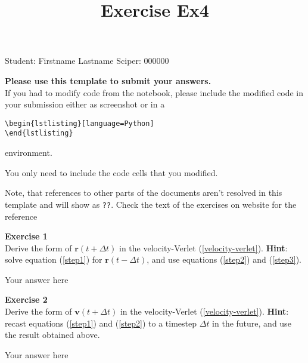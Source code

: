 \documentclass{article}
\title{Exercise Ex4}
\begin{document}
\maketitle\maketitle
\begin{center}\logo\end{center}


Student:  Firstname Lastname    Sciper: 000000

\begin{mdframed}
\textbf{Please use this template to submit your answers.}\\
If you had to modify code from the notebook, please include the modified code in your submission either as screenshot or in a

\begin{verbatim}
\begin{lstlisting}[language=Python]
\end{lstlisting}
\end{verbatim}

environment.

You only need to include the code cells that you modified.

Note, that references to other parts of the documents aren't resolved in this template and will show as \texttt{??}. Check the text of the exercises on website for the reference
\end{mdframed}

\begin{mdframed}
\textbf{Exercise 1}\\
Derive the form of $\mathbf{r}(t + \Delta t)$ in the velocity-Verlet
(\ref{velocity-verlet}). \textbf{Hint}: solve equation  (\ref{step1}) for  $\mathbf{r}(t - \Delta t)$, and use equations (\ref{step2}) and  (\ref{step3}).
\end{mdframed}

Your answer here

\begin{mdframed}
\textbf{Exercise 2}\\
Derive the form of $\mathbf{v}(t + \Delta t)$ in the velocity-Verlet  (\ref{velocity-verlet}). \textbf{Hint}: recast equations  (\ref{step1}) and (\ref{step2}) to a  timestep $\Delta t$ in the future, and use the result obtained  above.
\end{mdframed}

Your answer here
\end{document}
